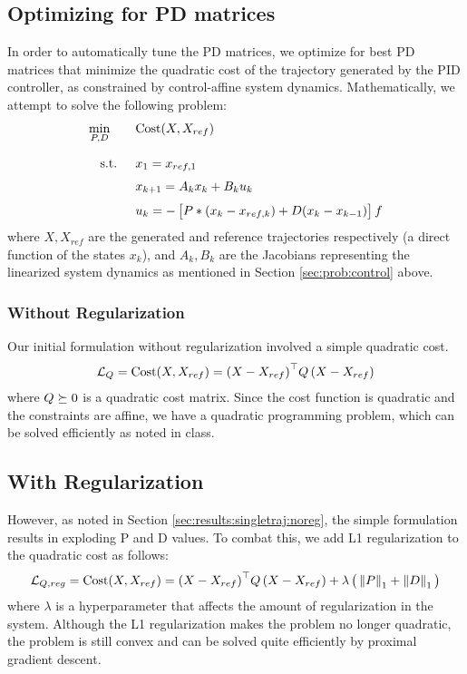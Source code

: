 \documentclass[11pt]{article}
\begin{document}
    \subsection{Optimizing for PD matrices} \label{sec:prob:pdoptim}
    In order to automatically tune the PD matrices, we optimize for best PD matrices that minimize the quadratic cost of the trajectory generated by the PID controller, as constrained by control-affine system dynamics. Mathematically, we attempt to solve the following problem:
    \begin{align*}
        \min_{P,D}\qquad & \mathrm{Cost}(X, X_{ref}) \fracln
        \st \quad & x_1 = x_{ref, 1} \vecln
        &         x_{k+1} = A_k x_k + B_k u_k \vecln
        &         u_k = - \left[\strut P * \left(x_{k} - x_{ref,k}\right) + D (x_k - x_{k-1}) \strut \right]
f    \end{align*}
    where $X, X_{ref}$ are the generated and reference trajectories respectively (a direct function of the states $x_k$), and $A_k, B_k$ are the Jacobians representing the linearized system dynamics as mentioned in Section \ref{sec:prob:control} above.
    
    \subsubsection{Without Regularization} \label{sec:prob:pdoptim:noreg}
    Our initial formulation without regularization involved a simple quadratic cost.
    \begin{align*}
        \mathcal{L}_Q = \mathrm{Cost}(X, X_{ref}) = {\left(X - X_{ref}\right)}^{\top} Q \left(X - X_{ref}\right)
    \end{align*}
    where $Q \succeq 0 $ is a quadratic cost matrix. Since the cost function is quadratic and the constraints are affine, we have a quadratic programming problem, which can be solved efficiently as noted in class.
    
    \subsection{With Regularization} \label{sec:prob:pdoptim:wreg}
    However, as noted in Section \ref{sec:results:singletraj:noreg}, the simple formulation results in exploding P and D values. To combat this, we add L1 regularization to the quadratic cost as follows:
    \begin{align*}
        \mathcal{L}_{Q,reg} = \mathrm{Cost}(X, X_{ref}) = {\left(X - X_{ref}\right)}^{\top} Q \left(X - X_{ref}\right) + \lambda \left(\strut \left\lVert P\right\rVert_1 + \left\lVert D\right\rVert_1 \strut \right)
    \end{align*}
    where $\lambda$ is a hyperparameter that affects the amount of regularization in the system. Although the L1 regularization makes the problem no longer quadratic, the problem is still convex and can be solved quite efficiently by proximal gradient descent.
    
\end{document}

